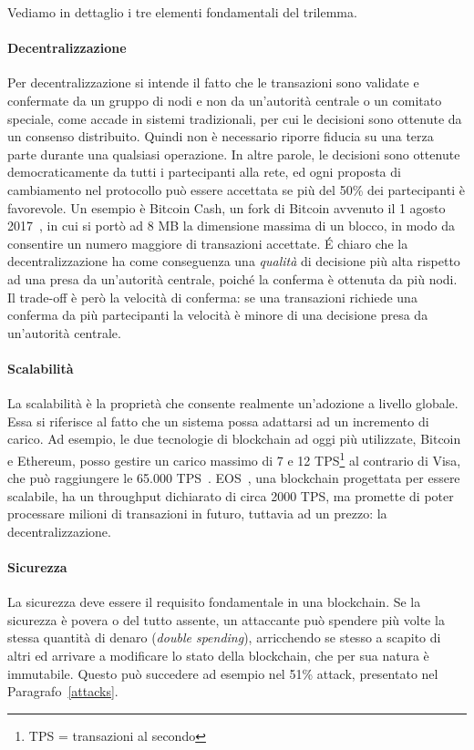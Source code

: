 Vediamo in dettaglio i tre elementi fondamentali del trilemma.

\paragraph{Decentralizzazione}
Per decentralizzazione si intende il fatto che le transazioni sono validate e confermate da un gruppo di nodi e non da un'autorità centrale o un comitato speciale, come accade in sistemi tradizionali, per cui le decisioni sono ottenute da un consenso distribuito. Quindi non è necessario riporre fiducia su una terza parte durante una qualsiasi operazione. In altre parole, le decisioni sono ottenute democraticamente da tutti i partecipanti alla rete, ed ogni proposta di cambiamento nel protocollo può essere accettata se più del 50\% dei partecipanti è favorevole. Un esempio è Bitcoin Cash, un fork di Bitcoin avvenuto il 1 agosto 2017~\cite{bcash}, in cui si portò ad 8 MB la dimensione massima di un blocco, in modo da consentire un numero maggiore di transazioni accettate.
\'E chiaro che la decentralizzazione ha come conseguenza una \emph{qualità} di decisione più alta rispetto ad una presa da un'autorità centrale, poiché la conferma è ottenuta da più nodi. Il trade-off è però la velocità di conferma: se una transazioni richiede una conferma da più partecipanti la velocità è minore di una decisione presa da un'autorità centrale.

\paragraph{Scalabilità}
La scalabilità è la proprietà che consente realmente un'adozione a livello globale. Essa si riferisce al fatto che un sistema possa adattarsi ad un incremento di carico. Ad esempio, le due tecnologie di blockchain ad oggi più utilizzate, Bitcoin e Ethereum, posso gestire un carico massimo di 7 e 12 TPS\footnote{TPS = transazioni al secondo}
al contrario di Visa, che può raggiungere le 65.000 TPS~\cite{visatps}. EOS~\cite{xu2018eos}, una blockchain progettata per essere scalabile, ha un throughput dichiarato di circa 2000 TPS, ma promette di poter processare milioni di transazioni in futuro, tuttavia ad un prezzo: la decentralizzazione.

\paragraph{Sicurezza}
La sicurezza deve essere il requisito fondamentale in una blockchain. Se la sicurezza è povera o del tutto assente, un attaccante può spendere più volte la stessa quantità di denaro (\emph{double spending}), arricchendo se stesso a scapito di altri ed arrivare a modificare lo stato della blockchain, che per sua natura è immutabile. Questo può succedere ad esempio nel 51\% attack, presentato nel Paragrafo~\ref{attacks}.

